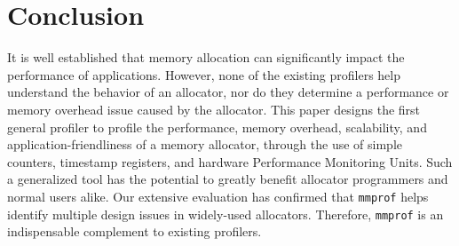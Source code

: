\section{Conclusion}
\label{sec:conclusion}

It is well established that memory allocation can significantly impact the performance of applications. However, none of the existing profilers help understand the behavior of an allocator, nor do they determine a performance or memory overhead issue caused by the allocator. This paper designs the first general profiler to profile the performance, memory overhead, scalability, and application-friendliness of a memory allocator, through the use of simple counters, timestamp registers, and hardware Performance Monitoring Units. Such a generalized tool has the potential to greatly benefit allocator programmers and normal users alike. Our extensive evaluation has confirmed that \texttt{mmprof} helps identify multiple design issues in widely-used allocators. Therefore, \texttt{mmprof} is an indispensable complement to existing profilers. 